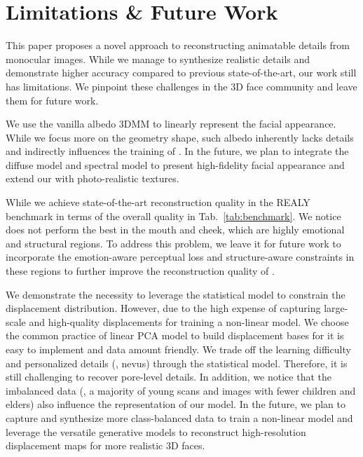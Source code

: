 \section{Limitations \& Future Work}
\label{sec.supp_limit}

This paper proposes a novel approach to reconstructing animatable details from monocular images. While we manage to synthesize realistic details and demonstrate higher accuracy compared to previous state-of-the-art, our work still has limitations. We pinpoint these challenges in the 3D face community and leave them for future work.


We use the vanilla albedo 3DMM to linearly represent the facial appearance. While we focus more on the geometry shape, such albedo inherently lacks details and indirectly influences the training of {\name}. In the future, we plan to integrate the diffuse model and spectral model to present high-fidelity facial appearance and extend our {\name} with photo-realistic textures.


While we achieve state-of-the-art reconstruction quality in the REALY~\cite{REALY} benchmark in terms of the overall quality in Tab.~\ref{tab:benchmark}. We notice {\name} does not perform the best in the mouth and cheek, which are highly emotional and structural regions. To address this problem, we leave it for future work to incorporate the emotion-aware perceptual loss and structure-aware constraints in these regions to further improve the reconstruction quality of {\name}.

We demonstrate the necessity to leverage the statistical model to constrain the displacement distribution. However, due to the high expense of capturing large-scale and high-quality displacements for training a non-linear model. We choose the common practice of linear PCA model to build displacement bases for it is easy to implement and data amount friendly.
We trade off the learning difficulty and personalized details ({\eg}, nevus) through the statistical model. Therefore, it is still challenging to recover pore-level details.
In addition, we notice that the imbalanced data ({\ie}, a majority of young scans and images with fewer children and elders) also influence the representation of our model. In the future, we plan to capture and synthesize more class-balanced data to train a non-linear model and leverage the versatile generative models to reconstruct high-resolution displacement maps for more realistic 3D faces.




